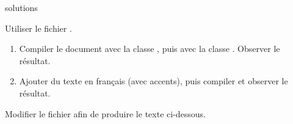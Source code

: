 {\begin{Filesave}{solutions}
\end{Filesave}

\begin{exercice}[nosol]
  Utiliser le fichier .
  \begin{enumerate}
  \item Compiler le document avec la classe , puis avec
    la classe . Observer le résultat.
  \item Ajouter du texte en français (avec accents), puis compiler et
    observer le résultat.
  \end{enumerate}
\end{exercice}

\begin{exercice}
  \label{ex:base:commandes}
  Modifier le fichier  afin
  de produire le texte ci-dessous.
  \begin{demo}
  \end{demo}

\end{exercice}}

